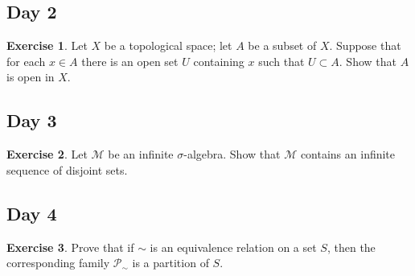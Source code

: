 \documentclass{article}
\theoremstyle{definition}
\newtheorem*{exercise}{Exercise}
\begin{document}
\subsection*{Day 2}
\begin{exercise}
    Let \(X\) be a topological space; let \(A\) be a subset of \(X\). Suppose that for each \(x\in A\) there is an open set \(U\) containing \(x\) such that \(U\subset A\). Show that \(A\) is open in \(X\).
\end{exercise}

\subsection*{Day 3}
\begin{exercise}
    Let \(\mathcal{M}\) be an infinite \(\sigma\)-algebra. Show that \(\mathcal{M}\) contains an infinite sequence of disjoint sets.
\end{exercise}

\subsection*{Day 4}
\begin{exercise}
    Prove that if \(\sim\) is an equivalence relation on a set \(S\), then the corresponding family \(\mathscr{P}_\sim\) is a partition of \(S\).
\end{exercise}
\end{document}
